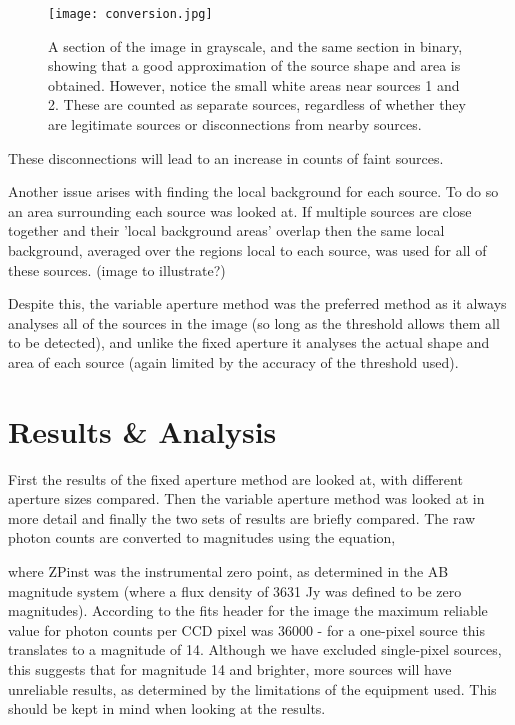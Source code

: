 \documentclass[a4paper,11pt,twoside]{article}
\begin{document}
\begin{figure}[htb]
  \centering
  \texttt{[image: conversion.jpg]}
  \caption{A section of the image in grayscale, and the same section in binary, showing that a good approximation of the source shape and area is obtained. However, notice the small white areas near sources 1 and 2. These are counted as separate sources, regardless of whether they are legitimate sources or disconnections from nearby sources.}
  \label{fig:conversion}
\end{figure}

These disconnections will lead to an increase in counts of faint sources.

Another issue arises with finding the local background for each source. To do so an area surrounding each source was looked at. If multiple sources are close together and their 'local background areas' overlap then the same local background, averaged over the regions local to each source, was used for all of these sources. (image to illustrate?)

Despite this, the variable aperture method was the preferred method as it always analyses all of the sources in the image (so long as the threshold allows them all to be detected), and unlike the fixed aperture it analyses the actual shape and area of each source (again limited by the accuracy of the threshold used).

\section{Results \& Analysis}

First the results of the fixed aperture method are looked at, with different aperture sizes compared. Then the variable aperture method was looked at in more detail and finally the two sets of results are briefly compared.
The raw photon counts are converted to magnitudes using the equation,


where ZPinst was the instrumental zero point, as determined in the AB magnitude system (where a flux density of 3631 Jy was defined to be zero magnitudes). 
According to the fits header for the image the maximum reliable value for photon counts per CCD pixel was 36000 - for a one-pixel source this translates to a magnitude of 14. Although we have excluded single-pixel sources, this suggests that for magnitude 14 and brighter, more sources will have unreliable results, as determined by the limitations of the equipment used. This should be kept in mind when looking at the results.
\end{document}

